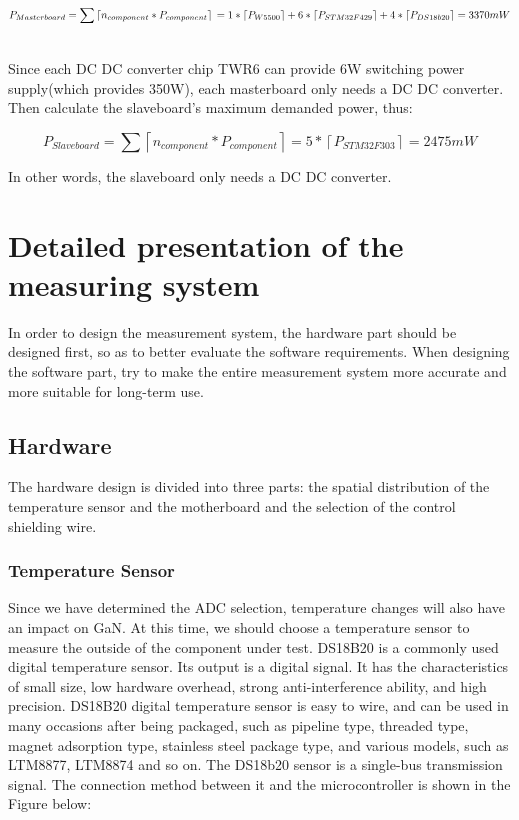 \begin{center} 
\begin{equation}
P_{Masterboard} = \sum \left \lceil n_{component}*P_{component}\right \rceil 
\\
=1*\left \lceil P_{W5500}  \right \rceil +6* \left \lceil P_{STM32F429}  \right \rceil+ 4* \left \lceil P_{DS18b20}\right \rceil = 3370mW
\end{equation}
\end{center}
\\
Since each DC DC converter chip TWR6 can provide 6W switching power supply(which provides 350W), each masterboard only needs a DC DC converter. 
Then calculate the slaveboard’s maximum demanded power, thus: 
\begin{center} 
\begin{equation}
P_{Slaveboard} = \sum \left \lceil n_{component}*P_{component}\right \rceil=5* \left \lceil P_{STM32F303}  \right \rceil= 2475mW
\end{equation}
\end{center}
In other words, the slaveboard only needs a DC DC converter.

\chapter{Detailed presentation of the measuring system}
\label{chap:Detailed presentation of the measuring system}
In order to design the measurement system, the hardware part should be designed first, so as to better evaluate the software requirements. When designing the software part, try to make the entire measurement system more accurate and more suitable for long-term use.

\section{Hardware}
\label{sec:Hardware}
The hardware design is divided into three parts: the spatial distribution of the temperature sensor and the motherboard and the selection of the control shielding wire.
\subsection{Temperature Sensor}
\label{sec:Temperature Sensor}
Since we have determined the ADC selection, temperature changes will also
have an impact on GaN.
At this time, we should choose a temperature sensor to measure the outside
of the component under test.
DS18B20 is a commonly used digital temperature sensor. Its output is a digital
signal. It has the characteristics of small size, low hardware overhead, strong
anti-interference ability, and high precision. DS18B20 digital temperature
sensor is easy to wire, and can be used in many occasions after being
packaged, such as pipeline type, threaded type, magnet adsorption type,
stainless steel package type, and various models, such as LTM8877, LTM8874
and so on.
The DS18b20 sensor is a single-bus transmission signal. The connection
method between it and the microcontroller is shown in the Figure below:

